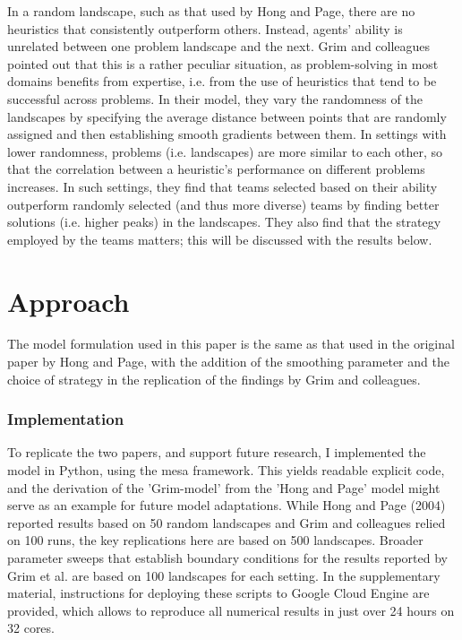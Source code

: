 In a random landscape, such as that used by Hong and Page, there are no heuristics that consistently outperform others. Instead, agents' ability is unrelated between one problem landscape and the next. Grim and colleagues pointed out that this is a rather peculiar situation, as problem-solving in most domains benefits from expertise, i.e. from the use of heuristics that tend to be successful across problems. In their model, they vary the randomness of the landscapes by specifying the average distance between points that are randomly assigned and then establishing smooth gradients between them. In settings with lower randomness, problems (i.e. landscapes) are more similar to each other, so that the correlation between a heuristic's performance on different problems increases. In such settings, they find that teams selected based on their ability outperform randomly selected (and thus more diverse) teams by finding better solutions (i.e. higher peaks) in the landscapes. They also find that the strategy employed by the teams matters; this will be discussed with the results below.

\section{Approach}

The model formulation used in this paper is the same as that used in the original paper by Hong and Page, with the addition of the smoothing parameter and the choice of strategy in the replication of the findings by Grim and colleagues.

\subsubsection{Implementation}

To replicate the two papers, and support future research, I implemented the model in Python, using the mesa framework\supercite{kazil2020utilizing}. This yields readable explicit code, and the derivation of the 'Grim-model' from the 'Hong and Page' model might serve as an example for future model adaptations. While Hong and Page (2004) reported results based on 50 random landscapes and Grim and colleagues relied on 100 runs, the key replications here are based on 500 landscapes. Broader parameter sweeps that establish boundary conditions for the results reported by Grim et al. are based on 100 landscapes for each setting. In the supplementary material, instructions for deploying these scripts to Google Cloud Engine are provided, which allows to reproduce all numerical results in just over 24 hours on 32 cores.


